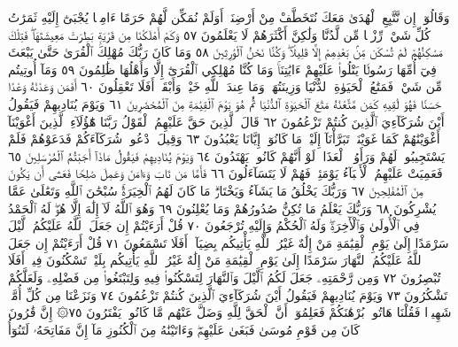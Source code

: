 وَقَالُوٓا۟ إِن نَّتَّبِعِ ٱلْهُدَىٰ مَعَكَ نُتَخَطَّفْ مِنْ أَرْضِنَآۚ أَوَلَمْ
نُمَكِّن لَّهُمْ حَرَمًا ءَامِنࣰا يُجْبَىٰٓ إِلَيْهِ ثَمَرَٰتُ كُلِّ شَيْءࣲ رِّزْقࣰا
مِّن لَّدُنَّا وَلَٰكِنَّ أَكْثَرَهُمْ لَا يَعْلَمُونَ ٥٧ وَكَمْ أَهْلَكْنَا مِن
قَرْيَةِۭ بَطِرَتْ مَعِيشَتَهَاۖ فَتِلْكَ مَسَٰكِنُهُمْ لَمْ تُسْكَن مِّنۢ
بَعْدِهِمْ إِلَّا قَلِيلࣰاۖ وَكُنَّا نَحْنُ ٱلْوَٰرِثِينَ ٥٨ وَمَا كَانَ رَبُّكَ
مُهْلِكَ ٱلْقُرَىٰ حَتَّىٰ يَبْعَثَ فِيٓ أُمِّهَا رَسُولࣰا يَتْلُوا۟ عَلَيْهِمْ
ءَايَٰتِنَاۚ وَمَا كُنَّا مُهْلِكِي ٱلْقُرَىٰٓ إِلَّا وَأَهْلُهَا ظَٰلِمُونَ ٥٩
وَمَآ أُوتِيتُم مِّن شَيْءࣲ فَمَتَٰعُ ٱلْحَيَوٰةِ ٱلدُّنْيَا وَزِينَتُهَاۚ وَمَا عِندَ
ٱللَّهِ خَيْرࣱ وَأَبْقَىٰٓۚ أَفَلَا تَعْقِلُونَ ٦٠ أَفَمَن وَعَدْنَٰهُ وَعْدًا حَسَنࣰا
فَهُوَ لَٰقِيهِ كَمَن مَّتَّعْنَٰهُ مَتَٰعَ ٱلْحَيَوٰةِ ٱلدُّنْيَا ثُمَّ هُوَ يَوْمَ ٱلْقِيَٰمَةِ
مِنَ ٱلْمُحْضَرِينَ ٦١ وَيَوْمَ يُنَادِيهِمْ فَيَقُولُ أَيْنَ شُرَكَآءِيَ
ٱلَّذِينَ كُنتُمْ تَزْعُمُونَ ٦٢ قَالَ ٱلَّذِينَ حَقَّ عَلَيْهِمُ ٱلْقَوْلُ رَبَّنَا
هَٰٓؤُلَآءِ ٱلَّذِينَ أَغْوَيْنَآ أَغْوَيْنَٰهُمْ كَمَا غَوَيْنَاۖ تَبَرَّأْنَآ إِلَيْكَۖ
مَا كَانُوٓا۟ إِيَّانَا يَعْبُدُونَ ٦٣ وَقِيلَ ٱدْعُوا۟ شُرَكَآءَكُمْ فَدَعَوْهُمْ فَلَمْ
يَسْتَجِيبُوا۟ لَهُمْ وَرَأَوُا۟ ٱلْعَذَابَۚ لَوْ أَنَّهُمْ كَانُوا۟ يَهْتَدُونَ ٦٤
وَيَوْمَ يُنَادِيهِمْ فَيَقُولُ مَاذَآ أَجَبْتُمُ ٱلْمُرْسَلِينَ ٦٥ فَعَمِيَتْ
عَلَيْهِمُ ٱلْأَنۢبَآءُ يَوْمَئِذࣲ فَهُمْ لَا يَتَسَآءَلُونَ ٦٦ فَأَمَّا مَن تَابَ
وَءَامَنَ وَعَمِلَ صَٰلِحࣰا فَعَسَىٰٓ أَن يَكُونَ مِنَ ٱلْمُفْلِحِينَ ٦٧
وَرَبُّكَ يَخْلُقُ مَا يَشَآءُ وَيَخْتَارُۗ مَا كَانَ لَهُمُ ٱلْخِيَرَةُۚ سُبْحَٰنَ
ٱللَّهِ وَتَعَٰلَىٰ عَمَّا يُشْرِكُونَ ٦٨ وَرَبُّكَ يَعْلَمُ مَا تُكِنُّ
صُدُورُهُمْ وَمَا يُعْلِنُونَ ٦٩ وَهُوَ ٱللَّهُ لَآ إِلَٰهَ إِلَّا هُوَۖ لَهُ
ٱلْحَمْدُ فِي ٱلْأُولَىٰ وَٱلْأٓخِرَةِۖ وَلَهُ ٱلْحُكْمُ وَإِلَيْهِ تُرْجَعُونَ ٧٠
قُلْ أَرَءَيْتُمْ إِن جَعَلَ ٱللَّهُ عَلَيْكُمُ ٱلَّيْلَ سَرْمَدًا إِلَىٰ يَوْمِ
ٱلْقِيَٰمَةِ مَنْ إِلَٰهٌ غَيْرُ ٱللَّهِ يَأْتِيكُم بِضِيَآءٍۚ أَفَلَا تَسْمَعُونَ ٧١
قُلْ أَرَءَيْتُمْ إِن جَعَلَ ٱللَّهُ عَلَيْكُمُ ٱلنَّهَارَ سَرْمَدًا إِلَىٰ
يَوْمِ ٱلْقِيَٰمَةِ مَنْ إِلَٰهٌ غَيْرُ ٱللَّهِ يَأْتِيكُم بِلَيْلࣲ تَسْكُنُونَ
فِيهِۚ أَفَلَا تُبْصِرُونَ ٧٢ وَمِن رَّحْمَتِهِۦ جَعَلَ لَكُمُ ٱلَّيْلَ
وَٱلنَّهَارَ لِتَسْكُنُوا۟ فِيهِ وَلِتَبْتَغُوا۟ مِن فَضْلِهِۦ وَلَعَلَّكُمْ
تَشْكُرُونَ ٧٣ وَيَوْمَ يُنَادِيهِمْ فَيَقُولُ أَيْنَ شُرَكَآءِيَ ٱلَّذِينَ
كُنتُمْ تَزْعُمُونَ ٧٤ وَنَزَعْنَا مِن كُلِّ أُمَّةࣲ شَهِيدࣰا فَقُلْنَا
هَاتُوا۟ بُرْهَٰنَكُمْ فَعَلِمُوٓا۟ أَنَّ ٱلْحَقَّ لِلَّهِ وَضَلَّ عَنْهُم
مَّا كَانُوا۟ يَفْتَرُونَ ٧٥۞ إِنَّ قَٰرُونَ كَانَ مِن قَوْمِ مُوسَىٰ
فَبَغَىٰ عَلَيْهِمْۖ وَءَاتَيْنَٰهُ مِنَ ٱلْكُنُوزِ مَآ إِنَّ مَفَاتِحَهُۥ لَتَنُوٓأُ
